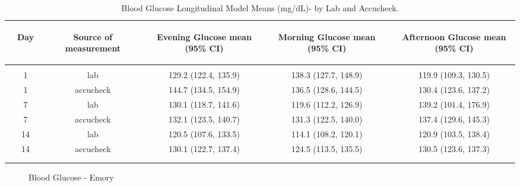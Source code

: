 \documentclass[dvips, 10pt]{article}
\begin{document}
\begin{table}[t]
\caption
{ Blood Glucose Longitudinal Model Means (mg/dL)- by Lab and Accucheck. }
\begin{center}
\begin{tabular}{ @{}l@{}
@{}c@{}@{}p{1.5em}@{}@{}c@{}@{}p{1.5em}@{}@{}c@{}@{}p{1.5em}@{}@{}c@{}@{}p{1.5em}@{}@{}c@{}
}
\hline

& \parbox{6em}{\begin{center}Day\end{center}} && \parbox{6em}{\begin{center}Source of measurement\end{center}} && \parbox{6em}{\begin{center}Evening Glucose mean (95\% CI)\end{center}} && \parbox{6em}{\begin{center}Morning Glucose mean (95\% CI)\end{center}} && \parbox{6em}{\begin{center}Afternoon Glucose mean (95\% CI)\end{center}} \\

\hline

\\
& 1 && lab && 129.2 (122.4, 135.9) && 138.3 (127.7, 148.9) && 119.9 (109.3, 130.5) \\
& 1 && accucheck && 144.7 (134.5, 154.9) && 136.5 (128.6, 144.5) && 130.4 (123.6, 137.2) \\
& 7 && lab && 130.1 (118.7, 141.6) && 119.6 (112.2, 126.9) && 139.2 (101.4, 176.9) \\
& 7 && accucheck && 132.1 (123.5, 140.7) && 131.3 (122.5, 140.0) && 137.4 (129.6, 145.3) \\
& 14 && lab && 120.5 (107.6, 133.5) && 114.1 (108.2, 120.1) && 120.9 (103.5, 138.4) \\
& 14 && accucheck && 130.1 (122.7, 137.4) && 124.5 (113.5, 135.5) && 130.5 (123.6, 137.3) \\
\\
\hline \\

\end{tabular}

\end{center}
 \end{table}
\clearpage

\begin{figure}
\caption{Blood Glucose - Emory}
\end{figure}
\clearpage
\end{document}
